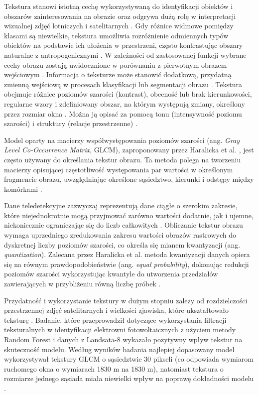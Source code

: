 \documentclass{amuthesis}
\begin{document}
Tekstura stanowi istotną cechę wykorzystywaną do identyfikacji obiektów
i obszarów zainteresowania na obrazie \autocite{haralick_1973_texture}
oraz odgrywa dużą rolę w interpretacji wizualnej zdjęć lotniczych i
satelitarnych \autocite{lewinski_2012_texture}. Gdy różnice widmowe
pomiędzy klasami są niewielkie, tekstura umożliwia rozróżnienie
odmiennych typów obiektów na podstawie ich ułożenia w przestrzeni,
często kontrastując obszary naturalne z antropogenicznymi
\autocite{grass_r_texture}. W zależności od zastosowanej funkcji wybrane
cechy obrazu zostają uwidocznione w porównaniu z pierwotnym obrazem
wejściowym \autocite{lewinski_2012_texture}. Informacja o teksturze może
stanowić dodatkową, przydatną zmienną wejściową w procesach klasyfikacji
lub segmentacji obrazu
\autocite{gong_1992_spatial_features,mumby_2002_ikonos}. Tekstura
obejmuje różnice poziomów szarości (kontrast), obecność lub brak
kierunkowości, regularne wzory i zdefiniowany obszar, na którym
występują zmiany, określony przez rozmiar okna
\autocite{hall_beyer_2017_glcm,grass_r_texture}. Można ją opisać za
pomocą tonu (intensywność poziomu szarości) i struktury (relacje
przestrzenne) \autocite{grass_r_texture}.

Model oparty na macierzy współwystępowania poziomów szarości (ang.
\emph{Gray Level Co-Occurrence Matrix}, GLCM), zaproponowany przez
Haralicka et al. \autocite*{haralick_1973_texture}, jest często używany
do określania tekstur obrazu. Ta metoda polega na tworzeniu macierzy
opisującej częstotliwość występowania par wartości w określonym
fragmencie obrazu, uwzględniając określone sąsiedztwo, kierunki i
odstępy między komórkami \autocite{kupidura_2019_texture}.

Dane teledetekcyjne zazwyczaj reprezentują dane ciągłe o szerokim
zakresie, które niejednokrotnie mogą przyjmować zarówno wartości
dodatnie, jak i ujemne, niekoniecznie ograniczając się do liczb
całkowitych \autocite{R-GLCMTextures}. Obliczanie tekstur obrazu wymaga
uprzedniego zredukowania zakresu wartości obrazów rastrowych do
dyskretnej liczby poziomów szarości, co określa się mianem kwantyzacji
(ang. \emph{quantization}). Zalecana przez Haralicka et al.
\autocite*{haralick_1973_texture} metoda kwantyzacji danych opiera się
na równym prawdopodobieństwie (ang. \emph{equal probability}), dokonując
redukcji poziomów szarości wykorzystując kwantyle do utworzenia
przedziałów zawierających w przybliżeniu równą liczbę próbek
\autocite{R-GLCMTextures}.

Przydatność i wykorzystanie tekstury w dużym stopniu zależy od
rozdzielczości przestrzennej zdjęć satelitarnych i wielkości zjawiska,
które ukształtowało teksturę \autocite{grass_r_texture}. Badanie, które
przeprowadził \textcite{zhang_2021_texture} dotyczące wykorzystania
filtracji teksturalnych w identyfikacji elektrowni fotowoltaicznych z
użyciem metody Random Forest i danych z Landsata-8 wykazało pozytywny
wpływ tekstur na skuteczność modelu. Według wyników badania najlepiej
dopasowany model wykorzystywał tekstury GLCM o sąsiedztwie 30 pikseli
(co odpowiada wymiarom ruchomego okna o wymiarach 1830 m na 1830 m),
natomiast tekstura o rozmiarze jednego sąsiada miała niewielki wpływ na
poprawę dokładności modelu \autocite{zhang_2021_texture}.
\end{document}
